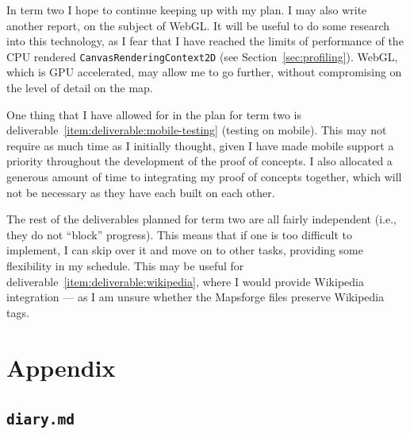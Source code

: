 \documentclass{final_report}
\begin{document}
In term two I hope to continue keeping up with my plan. I may also write another report, on the subject of WebGL\@. It will be useful to do some research into this technology, as I fear that I have reached the limits of performance of the CPU rendered \texttt{CanvasRenderingContext2D} (see Section~\ref{sec:profiling}). WebGL, which is GPU accelerated, may allow me to go further, without compromising on the level of detail on the map.

One thing that I have allowed for in the plan for term two is deliverable~\ref{item:deliverable:mobile-testing} (testing on mobile). This may not require as much time as I initially thought, given I have made mobile support a priority throughout the development of the proof of concepts. I also allocated a generous amount of time to integrating my proof of concepts together, which will not be necessary as they have each built on each other.

The rest of the deliverables planned for term two are all fairly independent (i.e., they do not ``block'' progress). This means that if one is too difficult to implement, I can skip over it and move on to other tasks, providing some flexibility in my schedule. This may be useful for deliverable~\ref{item:deliverable:wikipedia}, where I would provide Wikipedia integration --- as I am unsure whether the Mapsforge files preserve Wikipedia tags.

\clearpage
\chapter{Appendix}

\section{\texttt{diary.md}}




\renewcommand*{\bibfont}{\normalfont\small}
\printbibliography{}
\end{document}
